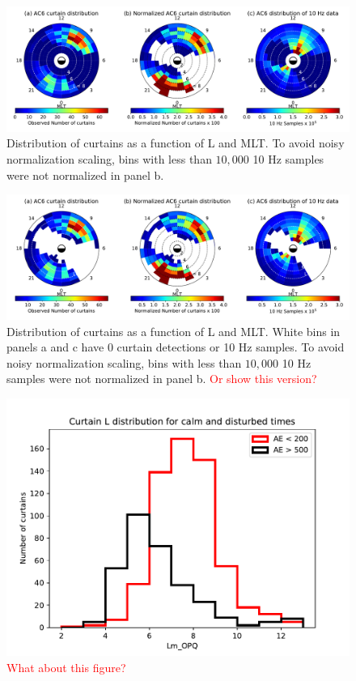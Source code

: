 \documentclass[draft]{agujournal2019}
\begin{document}
\begin{figure}
\includegraphics[width=\textwidth]{fig2.pdf}
\caption{Distribution of curtains as a function of L and MLT. To avoid noisy normalization scaling, bins with less than $10,000$ 10 Hz samples were not normalized in panel b.}
\end{figure}

\begin{figure}
\includegraphics[width=\textwidth]{fig2_2.pdf}
\caption{Distribution of curtains as a function of L and MLT. White bins in panels a and c have 0 curtain detections or 10 Hz samples. To avoid noisy normalization scaling, bins with less than $10,000$ 10 Hz samples were not normalized in panel b. \textcolor{red}{Or show this version?}}
\end{figure}

\begin{figure}
\includegraphics[width=\textwidth]{curtain_L_vs_AE.pdf}
\caption{\textcolor{red}{What about this figure?}}
\end{figure}
\end{document}

